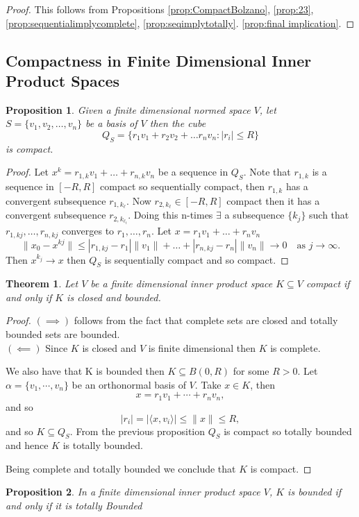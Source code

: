 \documentclass[11pt,openany]{book}
\theoremstyle{plain}
\newtheorem{theorem}{Theorem}[chapter]
\newtheorem{proposition}{Proposition}[chapter]
\theoremstyle{definition}
\theoremstyle{remark}
\begin{document}
\begin{proof}
    This follows from Propositions \ref{prop:CompactBolzano}, \ref{prop:23}, \ref{prop:sequentialimplycomplete}, \ref{prop:seqimplytotally}. \ref{prop:final implication}.
\end{proof}

\subsection{Compactness in Finite Dimensional Inner Product Spaces}
\begin{proposition}
    Given a finite dimensional normed space $V$, let $S = \{v_1,v_2, \dots, v_n\}$ be a basis of $V$ then the cube \[ Q_S = \{r_1v_1+r_2v_2+ \dots r_nv_n: |r_i|\le R\}\] is compact.
\end{proposition}

\begin{proof}
    Let $x^k = r_{1,k}v_1+ \dots + r_{n,k}v_n$ be a sequence in $Q_S$. Note that $r_{1,k}$ is a sequence in $[-R,R]$ compact so sequentially compact, then $r_{1,k}$ has a convergent subsequence $r_{1,k_\ell}$. Now $r_{2,k_\ell} \in [-R,R]$ compact then it has a convergent subsequence $r_{2,k_{\ell_t}}$. Doing this n-times $\exists$ a subsequence $\{k_j\}$ such that $r_{1,kj}, \dots , r_{n,kj}$ converges to $r_1,\dots , r_n$. Let $x = r_1v_1+ \dots +r_nv_n$\[ \|x_0-x^{kj}\| \le |r_{1,kj} - r_1|\|v_1\|+ \dots + |r_{n,kj}-r_n|\|v_n\| \to 0\quad \text{as }j\to \infty.\] Then $x^{k_j} \to x$ then $Q_S$ is sequentially compact and so compact.
\end{proof}

\begin{theorem}
    Let $V$ be a finite dimensional inner product space $K \subseteq V$ compact if and only if $K$ is closed and bounded.
\end{theorem}

\begin{proof}
    $(\implies)$ follows from the fact that complete sets are closed and totally bounded sets are bounded.
    \\
    $(\impliedby)$ Since $K$ is closed and $V$ is finite dimensional then $K$ is complete.
    
    We also have that K is bounded then $K\subseteq B(0,R)$ for some $R>0$. Let $\alpha=\{v_1,\cdots,v_n\}$ be an orthonormal basis of $V$. Take $x\in K$, then
    $$x=r_1v_1+\cdots+r_nv_n,$$
    and so $$|r_i|=|\langle x,v_i\rangle|\leq \|x\|\leq R,$$ and so $K\subseteq Q_S$. From the previous proposition $Q_S$ is compact so totally bounded and hence $K$ is totally bounded.

    Being complete and totally bounded we conclude that $K$ is compact.
    
\end{proof}
\begin{proposition}
    In a finite dimensional inner product space $V$,
    $K$ is bounded if and only if it is totally Bounded
\end{proposition}
\end{document}

